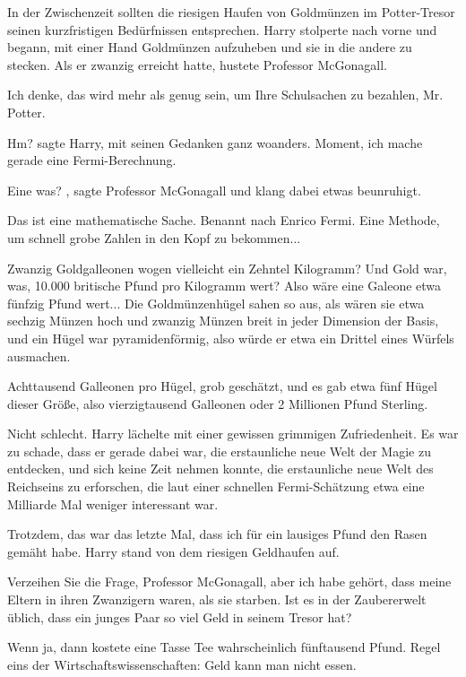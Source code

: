 In der Zwischenzeit sollten
die riesigen Haufen von Goldmünzen im Potter-Tresor seinen kurzfristigen Bedürfnissen entsprechen. Harry stolperte nach
vorne und begann, mit einer Hand Goldmünzen aufzuheben und sie in die andere zu stecken. Als er zwanzig erreicht hatte,
hustete Professor McGonagall.

\glqq Ich denke, das wird mehr als genug sein, um Ihre Schulsachen zu
bezahlen, Mr. Potter.\grqq{}

\glqq Hm?\grqq{} sagte Harry, mit seinen Gedanken ganz woanders. \glqq Moment,
ich mache gerade eine Fermi-Berechnung.\grqq{}

\glqq Eine was?\grqq{} , sagte Professor McGonagall und klang
dabei etwas beunruhigt.

\glqq Das ist eine mathematische Sache. Benannt nach Enrico Fermi. Eine Methode, um
schnell grobe Zahlen in den Kopf zu bekommen...\grqq{}

Zwanzig Goldgalleonen wogen vielleicht ein Zehntel
Kilogramm? Und Gold war, was, 10.000 britische Pfund pro Kilogramm wert? Also wäre eine Galeone etwa fünfzig Pfund
wert... Die Goldmünzenhügel sahen so aus, als wären sie etwa sechzig Münzen hoch und zwanzig Münzen breit in jeder
Dimension der Basis, und ein Hügel war pyramidenförmig, also würde er etwa ein Drittel eines Würfels ausmachen.

Achttausend Galleonen pro Hügel, grob geschätzt, und es gab etwa fünf Hügel dieser Größe, also
vierzigtausend Galleonen oder 2 Millionen Pfund Sterling.

Nicht schlecht. Harry lächelte mit einer gewissen
grimmigen Zufriedenheit. Es war zu schade, dass er gerade dabei war, die erstaunliche neue Welt der Magie zu entdecken,
und sich keine Zeit nehmen konnte, die erstaunliche neue Welt des Reichseins zu erforschen, die laut einer schnellen
Fermi-Schätzung etwa eine Milliarde Mal weniger interessant war.

Trotzdem, das war das letzte Mal, dass ich
für ein lausiges Pfund den Rasen gemäht habe. Harry stand von dem riesigen Geldhaufen auf.

\glqq Verzeihen
Sie die Frage, Professor McGonagall, aber ich habe gehört, dass meine Eltern in ihren Zwanzigern waren, als sie starben.
Ist es in der Zaubererwelt üblich, dass ein junges Paar so viel Geld in seinem Tresor hat?\grqq{}

Wenn ja,
dann kostete eine Tasse Tee wahrscheinlich fünftausend Pfund. Regel eins der Wirtschaftswissenschaften: Geld kann man
nicht essen.

